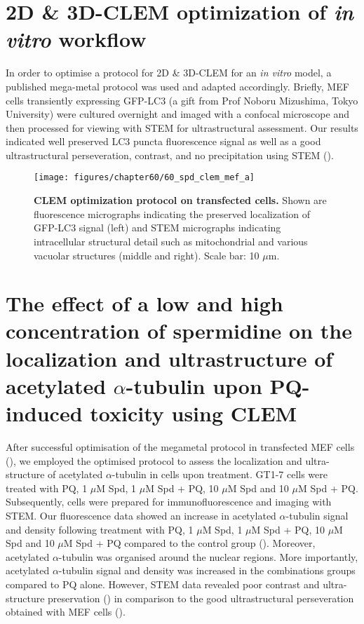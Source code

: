 \section{2D \& 3D-CLEM optimization of \textit{in vitro} workflow}
In order to optimise a protocol for 2D \& 3D-CLEM for an \textit{in vitro} model, a published mega-metal protocol was used \citep{Russell2017} and adapted accordingly. Briefly, MEF cells transiently expressing GFP-LC3 (a gift from Prof Noboru Mizushima, Tokyo University) were cultured overnight and imaged with a confocal microscope and then processed for viewing with STEM for ultrastructural assessment. Our results indicated well preserved LC3 puncta fluorescence signal as well as a good ultrastructural perseveration, contrast, and no precipitation using STEM (). 

\begin{figure}[!htbp]
\centering
  \texttt{[image: figures/chapter60/60\_spd\_clem\_mef\_a]}
  \caption[CLEM optimization protocol on transfected cells]{\textbf{CLEM optimization protocol on transfected cells.} Shown are fluorescence micrographs indicating the preserved localization of GFP-LC3 signal (left) and STEM micrographs indicating intracellular structural detail such as mitochondrial and various vacuolar structures (middle and right). Scale bar: 10 $\mu$m.}
  \label{fig:60_spd_clem_mef_a}
\end{figure} 

\section{The effect of a low and high concentration of spermidine on the localization and ultrastructure of acetylated $\alpha$-tubulin upon PQ-induced toxicity using CLEM}
\label{sec:Effect_low_high_spermidine_localization_ultrastructure of_tubulin_CLEM}
After successful optimisation of the megametal protocol in transfected MEF cells (), we employed the optimised protocol to assess the localization and ultra-structure of acetylated $\alpha$-tubulin in cells upon treatment. GT1-7 cells were treated with PQ, 1 $\mu$M Spd,  1 $\mu$M Spd + PQ, 10 $\mu$M Spd and 10 $\mu$M Spd + PQ. Subsequently, cells were prepared for immunofluorescence and imaging with STEM. Our fluorescence data showed an increase in acetylated $\alpha$-tubulin signal and density following treatment with PQ, 1 $\mu$M Spd, 1 $\mu$M Spd + PQ, 10 $\mu$M Spd and 10 $\mu$M Spd + PQ compared to the control group ().  Moreover, acetylated  $\alpha$-tubulin was  organised around the nuclear regions. More importantly, acetylated $\alpha$-tubulin signal and density was increased in the combinations groups compared to PQ alone. However, STEM data revealed poor contrast and ultra-structure preservation () in comparison to the good ultrastructural perseveration obtained with MEF cells (). 

